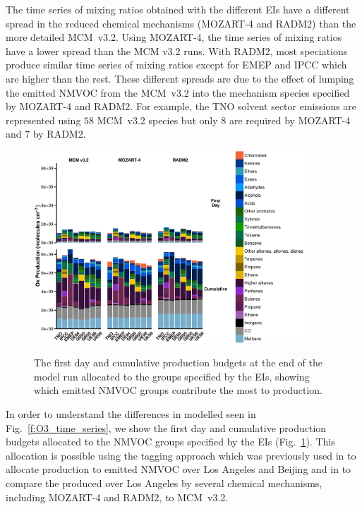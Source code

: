 \documentclass[14pt]{extarticle}
\begin{document}
The time series of  mixing ratios obtained with the different EIs have a different spread in the reduced chemical mechanisms (MOZART-4 and RADM2) than the more detailed MCM~v3.2.
Using MOZART-4, the time series of  mixing ratios have a lower spread than the MCM v3.2 runs.
With RADM2, most speciations produce similar time series of  mixing ratios except for EMEP and IPCC which are higher than the rest.
These different spreads are due to the effect of lumping the emitted NMVOC from the MCM~v3.2 into the mechanism species specified by MOZART-4 and RADM2.
For example, the TNO solvent sector emissions are represented using $58$ MCM~v3.2 species but only $8$ are required by MOZART-4 and $7$ by RADM2.

\begin{figure}
    \centering
    \caption{The first day and cumulative  production budgets at the end of the model run allocated to the groups specified by the EIs, showing which emitted NMVOC groups contribute the most to  production.}
    \includegraphics[width=0.9\textwidth]{Pictures/Cumulative_Ox_budget_allocated_facet_mechanism}
    \label{f:Ox_budget}
    \vspace{-2mm}
\end{figure}
In order to understand the differences in modelled  seen in Fig.~\ref{f:O3_time_series}, we show the first day and cumulative  production budgets allocated to the NMVOC groups specified by the EIs (Fig.~\ref{f:Ox_budget}). 
This allocation is possible using the tagging approach which was previously used in \citet{Butler:2011} to allocate  production to emitted NMVOC over Los Angeles and Beijing and in \citet{Coates:2015} to compare the  produced over Los Angeles by several chemical mechanisms, including MOZART-4 and RADM2, to MCM~v3.2.
\end{document}
